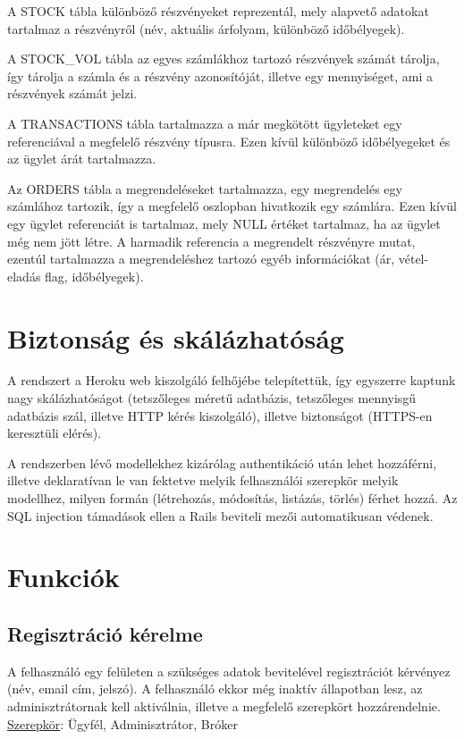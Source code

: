 A STOCK tábla különböző részvényeket reprezentál, mely alapvető adatokat tartalmaz a részvényről (név, aktuális árfolyam, különböző időbélyegek).

A STOCK\_VOL tábla az egyes számlákhoz tartozó részvények számát tárolja, így tárolja a számla és a részvény azonosítóját, illetve egy mennyiséget, ami a részvények számát jelzi.

A TRANSACTIONS tábla tartalmazza a már megkötött ügyleteket egy referenciával a megfelelő részvény típusra. Ezen kívül különböző időbélyegeket és az ügylet árát tartalmazza.

Az ORDERS tábla a megrendeléseket tartalmazza, egy megrendelés egy számlához tartozik, így a megfelelő oszlopban hivatkozik egy számlára. Ezen kívül egy ügylet referenciát is tartalmaz, mely NULL értéket tartalmaz, ha az ügylet még nem jött létre. A harmadik referencia a megrendelt részvényre mutat, ezentúl tartalmazza a megrendeléshez tartozó egyéb információkat (ár, vétel-eladás flag, időbélyegek).

\section{Biztonság és skálázhatóság}\label{sect:rsz_funkciok}
A rendszert a Heroku web kiszolgáló felhőjébe telepítettük, így egyszerre kaptunk nagy skálázhatóságot (tetszőleges méretű adatbázis, tetszőleges mennyisgű adatbázis szál, illetve HTTP kérés kiszolgáló), illetve biztonságot (HTTPS-en keresztüli elérés).

A rendszerben lévő modellekhez kizárólag authentikáció után lehet hozzáférni, illetve deklaratívan le van fektetve melyik felhasználói szerepkör melyik modellhez, milyen formán (létrehozás, módosítás, listázás, törlés) férhet hozzá. Az SQL injection támadások ellen a Rails beviteli mezői automatikusan védenek.

\section{Funkciók}\label{sect:rsz_funkciok}

\subsection{Regisztráció kérelme}
A felhasználó egy felületen a szükséges adatok bevitelével regisztrációt kérvényez (név, email cím, jelszó). A felhasználó ekkor még inaktív állapotban lesz, az adminisztrátornak kell aktiválnia, illetve a megfelelő szerepkört hozzárendelnie.
\newline \underline{Szerepkör}: Ügyfél, Adminisztrátor, Bróker

